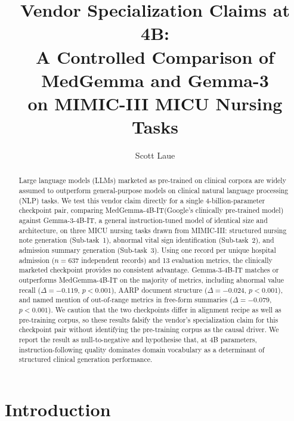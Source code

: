 \documentclass[sigconf,anonymous=false,review=false]{acmart}
\newcommand{\medgemma}{MedGemma-4B-IT\xspace}
\newcommand{\gemma}{Gemma-3-4B-IT\xspace}
\begin{document}
\title{Vendor Specialization Claims at 4B:\\ A Controlled Comparison of MedGemma and Gemma-3\\ on MIMIC-III MICU Nursing Tasks}

\author{Scott Laue}

\begin{abstract}
Large language models (LLMs) marketed as pre-trained on clinical corpora are
widely assumed to outperform general-purpose models on clinical natural language
processing (NLP) tasks. We test this vendor claim directly for a single
4-billion-parameter checkpoint pair, comparing
\medgemma (Google's clinically pre-trained model) against
\gemma, a general instruction-tuned model of identical size and architecture,
on three MICU nursing tasks drawn from MIMIC-III: structured nursing note
generation (Sub-task~1), abnormal vital sign identification (Sub-task~2), and
admission summary generation (Sub-task~3). Using one record per unique hospital
admission ($n = 637$ independent records) and 13 evaluation metrics, the
clinically marketed checkpoint provides no consistent advantage. \gemma matches
or outperforms \medgemma on the majority of metrics, including abnormal value
recall ($\Delta = -0.119$, $p < 0.001$), AARP document structure
($\Delta = -0.024$, $p < 0.001$), and named mention of out-of-range metrics
in free-form summaries ($\Delta = -0.079$, $p < 0.001$). We caution that the
two checkpoints differ in alignment recipe as well as pre-training corpus, so
these results falsify the vendor's specialization claim for this checkpoint
pair without identifying the pre-training corpus as the causal driver. We
report the result as null-to-negative and hypothesise that, at 4B parameters,
instruction-following quality dominates domain vocabulary as a determinant of
structured clinical generation performance.
\end{abstract}


\maketitle

\section{Introduction}
\label{sec:intro}
\end{document}
